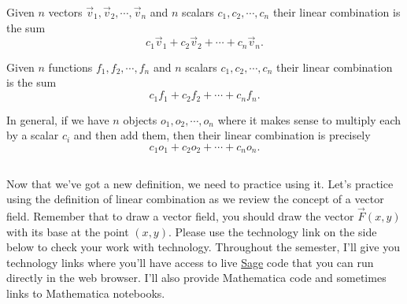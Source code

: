 \begin{definition}\label{def linear combination}
%
 Given $n$ vectors  $\vec v_1, \vec v_2,\cdots,\vec v_n$ and $n$ scalars $c_1, c_2, \cdots, c_n$ their linear combination is the sum $$c_1\vec v_1+c_2\vec v_2+\cdots+c_n\vec v_n.$$

 Given $n$ functions $f_1,f_2,\cdots,f_n$ and $n$ scalars $c_1, c_2, \cdots, c_n$ their linear combination is the sum 
$$c_1f_1+c_2 f_2+\cdots+c_nf_n.$$

In general, if we have $n$ objects $o_1, o_2, \cdots, o_n$ where it makes sense to multiply each by a scalar $c_i$ and then add them, then their linear combination is precisely 
$$c_1o_1+c_2 o_2+\cdots+c_no_n.$$
\end{definition}



\subsection*{\ideaB}


Now that we've got a new definition, we need to practice using it. 
Let's practice using the definition of linear combination as we review the concept of a vector field.  
Remember that to draw a vector field, you should draw the vector $\vec F(x,y)$ with its base at the point $(x,y)$.
%
Please use the technology link on the side below to check your work with technology. Throughout the semester, I'll give you technology links where you'll have access to live \href{http://sagemath.org/}{Sage} code that you can run directly in the web browser. I'll also provide Mathematica code and sometimes links to Mathematica notebooks.




